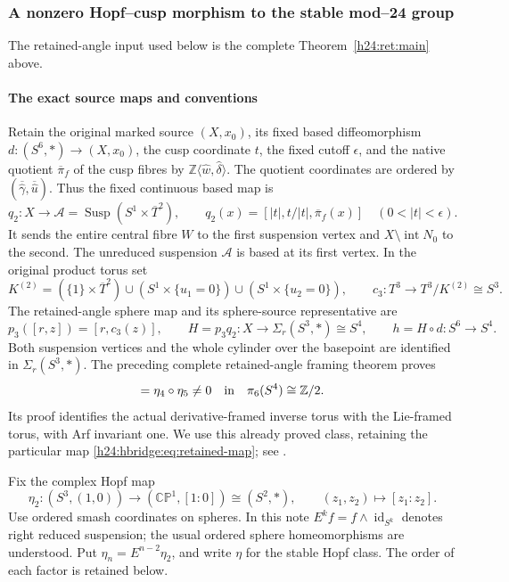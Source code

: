 \subsubsection{A nonzero Hopf--cusp morphism to the stable mod--24 group}
\label{h24:hbridge:section}
The retained-angle input used below is the complete Theorem~\ref{h24:ret:main} above.

\paragraph{The exact source maps and conventions}

Retain the original marked source \((X,x_0)\), its fixed based
diffeomorphism \(d:(S^6,*)\to(X,x_0)\), the cusp coordinate \(t\),
the fixed cutoff \(\epsilon\), and the native quotient
\(\overline\pi_f\) of the cusp fibres by
\(\mathbb Z\langle\widehat w,\widehat\delta\rangle\).
The quotient coordinates are ordered by
\((\overline{\widehat\gamma},\overline{\widehat u})\).
Thus the fixed continuous based map is
\[
q_2:X\longrightarrow
\mathcal A=\operatorname{Susp}(S^1\times\overline T^2),
\qquad
q_2(x)=[|t|,t/|t|,\overline\pi_f(x)]
\quad(0<|t|<\epsilon).
\]
It sends the entire central fibre \(W\) to the first suspension
vertex and \(X\setminus\operatorname{int}N_0\) to the second.
The unreduced suspension \(\mathcal A\) is based at its first
vertex. In the original product torus set
\[
K^{(2)}=(\{1\}\times\overline T^2)
\cup(S^1\times\{u_1=0\})
\cup(S^1\times\{u_2=0\}),
\qquad c_3:T^3\longrightarrow T^3/K^{(2)}\cong S^3.
\]
The retained-angle sphere map and its sphere-source representative are
\begin{equation}
p_3([r,z])=[r,c_3(z)],\qquad
H=p_3q_2:X\longrightarrow\Sigma_r(S^3,*)\cong S^4,
\qquad h=H\circ d:S^6\longrightarrow S^4.
\label{h24:hbridge:eq:retained-map}
\end{equation}
Both suspension vertices and the whole cylinder over the basepoint
are identified in \(\Sigma_r(S^3,*)\). The preceding complete
retained-angle framing theorem proves
\begin{equation}
[h]=\eta_4\circ\eta_5\ne0
\quad\hbox{in}\quad\pi_6(S^4)\cong\mathbb Z/2.
\label{h24:hbridge:eq:proved-H}
\end{equation}
Its proof identifies the actual derivative-framed inverse torus
with the Lie-framed torus, with Arf invariant one. We use this
already proved class, retaining the particular map
\eqref{h24:hbridge:eq:retained-map}; see \cite{h24:hbridgebib:HBRetained}.

Fix the complex Hopf map
\[
\eta_2:(S^3,(1,0))\longrightarrow
(\mathbb{CP}^1,[1:0])\cong(S^2,*),\qquad
(z_1,z_2)\longmapsto[z_1:z_2].
\]
Use ordered smash coordinates on spheres. In this note
\(E^k f=f\wedge\operatorname{id}_{S^k}\) denotes right reduced
suspension; the usual ordered sphere homeomorphisms are understood.
Put \(\eta_n=E^{n-2}\eta_2\), and write \(\eta\) for the
stable Hopf class. The order of each factor is retained below.

